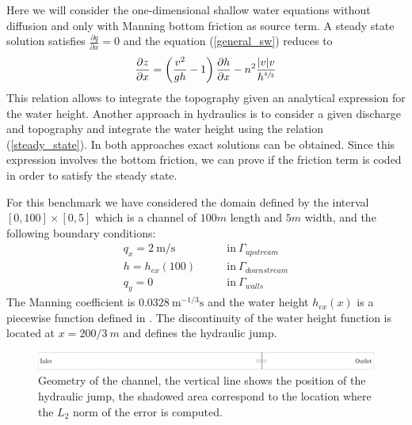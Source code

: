 \documentclass[a4paper,12pt]{article}
\newcommand{\pder}[2]{\frac{\partial#1}{\partial#2}}
\newcommand{\abs}[1]{\lvert#1\rvert}
\begin{document}
Here we will consider the one-dimensional shallow water equations without diffusion and only with Manning bottom friction as source term. A steady state solution satisfies $\pder{q}{x}=0$ and the equation (\ref{general_sw}) reduces to
\begin{equation} \label{steady_state}
\pder{z}{x} = \left(\frac{v^2}{gh}-1\right) \pder{h}{x} - n^2\frac{\abs{v}v}{h^{\sfrac{4}{3}}}
\end{equation}
This relation allows to integrate the topography given an analytical expression for the water height. Another approach in hydraulics is to consider a given discharge and topography and integrate the water height using the relation (\ref{steady_state}). In both approaches exact solutions can be obtained. Since this expression involves the bottom friction, we can prove if the friction term is coded in order to satisfy the steady state.

For this benchmark we have considered the domain defined by the interval $[0,100]\times[0,5]$ which is a channel of $100m$ length and $5m$ width, and the following boundary conditions:
\begin{equation}
\begin{split}
    q_x = 2\ \text{m/s} \qquad &\text{in} \ \Gamma_{upstream} \\
    h = h_{ex}(100) \qquad &\text{in} \ \Gamma_{downstream} \\
    q_y = 0 \qquad &\text{in} \ \Gamma_{walls}
\end{split}
\end{equation}
The Manning coefficient is $0.0328\ \text{m}^{-1/3}\text{s}$ and the water height $h_{ex}(x)$ is a piecewise function defined in \cite{delestre2013}. The discontinuity of the water height function is located at $x=200/3\ m$ and defines the hydraulic jump.

\begin{figure}
    \includegraphics[width=\textwidth]{img/jump/sketch/sketch.pdf}
    \caption{Geometry of the channel, the vertical line shows the position of the hydraulic jump, the shadowed area correspond to the location where the $L_2$ norm of the error is computed.}
\end{figure}
\end{document}
